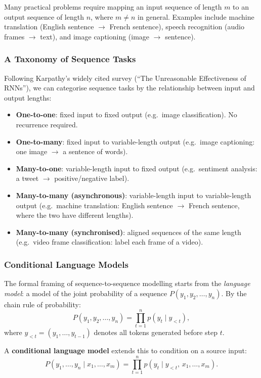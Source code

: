 \documentclass[11pt,a4paper]{article}
\newcommand{\term}[1]{\textcolor{DefGreen}{\textbf{#1}}\index{#1}}
\begin{document}
Many practical problems require mapping an input sequence of length $m$ to an output sequence of length $n$, where $m \neq n$ in general. Examples include machine translation (English sentence $\to$ French sentence), speech recognition (audio frames $\to$ text), and image captioning (image $\to$ sentence).

\subsubsection{A Taxonomy of Sequence Tasks}

Following Karpathy's widely cited survey (``The Unreasonable Effectiveness of RNNs''), we can categorise sequence tasks by the relationship between input and output lengths:

\begin{itemize}
  \item \textbf{One-to-one}: fixed input to fixed output (e.g.\ image classification). No recurrence required.
  \item \textbf{One-to-many}: fixed input to variable-length output (e.g.\ image captioning: one image $\to$ a sentence of words).
  \item \textbf{Many-to-one}: variable-length input to fixed output (e.g.\ sentiment analysis: a tweet $\to$ positive/negative label).
  \item \textbf{Many-to-many (asynchronous)}: variable-length input to variable-length output (e.g.\ machine translation: English sentence $\to$ French sentence, where the two have different lengths).
  \item \textbf{Many-to-many (synchronised)}: aligned sequences of the same length (e.g.\ video frame classification: label each frame of a video).
\end{itemize}

\subsubsection{Conditional Language Models}

The formal framing of sequence-to-sequence modelling starts from the \emph{language model}: a model of the joint probability of a sequence $P(y_1, y_2, \ldots, y_n)$. By the chain rule of probability:
\[
  P(y_1, y_2, \ldots, y_n) = \prod_{t=1}^{n} p(y_t \mid y_{<t}),
\]
where $y_{<t} = (y_1, \ldots, y_{t-1})$ denotes all tokens generated before step $t$.

A \term{conditional language model} extends this to condition on a source input:
\[
  P(y_1, \ldots, y_n \mid x_1, \ldots, x_m) = \prod_{t=1}^{n} p(y_t \mid y_{<t},\, x_1, \ldots, x_m).
\]
\end{document}
